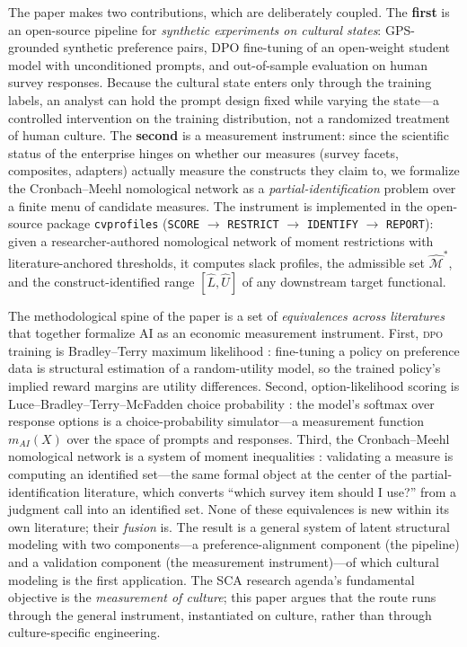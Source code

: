 \documentclass[11pt,letterpaper]{article}
\newcommand{\DPO}{\textsc{dpo}}
\newcommand{\cvp}{\texttt{cvprofiles}}
\begin{document}
The paper makes two contributions, which are deliberately coupled. The \textbf{first} is an open-source pipeline for \emph{synthetic experiments on cultural states}: GPS-grounded synthetic preference pairs, DPO fine-tuning of an open-weight student model with unconditioned prompts, and out-of-sample evaluation on human survey responses. Because the cultural state enters only through the training labels, an analyst can hold the prompt design fixed while varying the state---a controlled intervention on the training distribution, not a randomized treatment of human culture. The \textbf{second} is a measurement instrument: since the scientific status of the enterprise hinges on whether our measures (survey facets, composites, adapters) actually measure the constructs they claim to, we formalize the Cronbach--Meehl nomological network \cite{cronbach1955} as a \emph{partial-identification} problem \cite{manski2003} over a finite menu of candidate measures. The instrument is implemented in the open-source package \cvp{} (\texttt{SCORE} $\rightarrow$ \texttt{RESTRICT} $\rightarrow$ \texttt{IDENTIFY} $\rightarrow$ \texttt{REPORT}): given a researcher-authored nomological network of moment restrictions with literature-anchored thresholds, it computes slack profiles, the admissible set $\widehat{\mathcal{M}}^{*}$, and the construct-identified range $[\widehat{L},\widehat{U}]$ of any downstream target functional.

The methodological spine of the paper is a set of \emph{equivalences across literatures} that together formalize AI as an economic measurement instrument. First, \DPO{} training is Bradley--Terry maximum likelihood \cite{rafailov2023,bradley1952}: fine-tuning a policy on preference data is structural estimation of a random-utility model, so the trained policy's implied reward margins are utility differences. Second, option-likelihood scoring is Luce--Bradley--Terry--McFadden choice probability \cite{mcfadden1974}: the model's softmax over response options is a choice-probability simulator---a measurement function $m_{AI}(X)$ over the space of prompts and responses. Third, the Cronbach--Meehl nomological network is a system of moment inequalities \cite{cronbach1955,manski2003,dell2026}: validating a measure is computing an identified set---the same formal object at the center of the partial-identification literature, which converts ``which survey item should I use?'' from a judgment call into an identified set. None of these equivalences is new within its own literature; their \emph{fusion} is. The result is a general system of latent structural modeling with two components---a preference-alignment component (the pipeline) and a validation component (the measurement instrument)---of which cultural modeling is the first application. The SCA research agenda's fundamental objective is the \emph{measurement of culture}; this paper argues that the route runs through the general instrument, instantiated on culture, rather than through culture-specific engineering.
\end{document}
